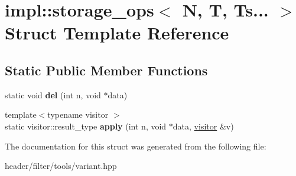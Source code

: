 \hypertarget{structimpl_1_1storage__ops_3_01_n_00_01_t_00_01_ts_8_8_8_01_4}{}\section{impl\+:\+:storage\+\_\+ops$<$ N, T, Ts... $>$ Struct Template Reference}
\label{structimpl_1_1storage__ops_3_01_n_00_01_t_00_01_ts_8_8_8_01_4}
\subsection*{Static Public Member Functions}
\begin{DoxyCompactItemize}
\item 
\mbox{\label{structimpl_1_1storage__ops_3_01_n_00_01_t_00_01_ts_8_8_8_01_4_af13df8a704e85720d6bb6cb3bcfd625f}} 
static void {\bfseries del} (int n, void $\ast$data)
\item 
\mbox{\label{structimpl_1_1storage__ops_3_01_n_00_01_t_00_01_ts_8_8_8_01_4_a47c8fe7ef7da5cc4a0088ed2672cc1c0}} 
{\footnotesize template$<$typename visitor $>$ }\\static visitor\+::result\+\_\+type {\bfseries apply} (int n, void $\ast$data, \hyperlink{structvisitor}{visitor} \&v)
\end{DoxyCompactItemize}


The documentation for this struct was generated from the following file\+:\begin{DoxyCompactItemize}
\item 
header/filter/tools/variant.\+hpp\end{DoxyCompactItemize}
